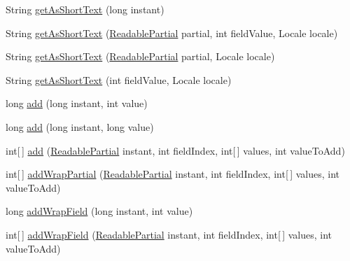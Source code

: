 \begin{DoxyCompactItemize}
\item 
String \hyperlink{classorg_1_1joda_1_1time_1_1field_1_1_unsupported_date_time_field_a0b88afcfc9204f496b03997297dc6c84}{get\-As\-Short\-Text} (long instant)
\item 
String \hyperlink{classorg_1_1joda_1_1time_1_1field_1_1_unsupported_date_time_field_a391c7e9cc51aa1ef611d4c1832d211ae}{get\-As\-Short\-Text} (\hyperlink{interfaceorg_1_1joda_1_1time_1_1_readable_partial}{Readable\-Partial} partial, int field\-Value, Locale locale)
\item 
String \hyperlink{classorg_1_1joda_1_1time_1_1field_1_1_unsupported_date_time_field_a62aaf212bda54158ccdd6e121dacc365}{get\-As\-Short\-Text} (\hyperlink{interfaceorg_1_1joda_1_1time_1_1_readable_partial}{Readable\-Partial} partial, Locale locale)
\item 
String \hyperlink{classorg_1_1joda_1_1time_1_1field_1_1_unsupported_date_time_field_a52cdc1898318945516da9385013a9162}{get\-As\-Short\-Text} (int field\-Value, Locale locale)
\item 
long \hyperlink{classorg_1_1joda_1_1time_1_1field_1_1_unsupported_date_time_field_ae9bece48037e0b2a2b18488367734e8b}{add} (long instant, int value)
\item 
long \hyperlink{classorg_1_1joda_1_1time_1_1field_1_1_unsupported_date_time_field_a54cd7b170f1d0bf9cfaa801cca7f4471}{add} (long instant, long value)
\item 
int\mbox{[}$\,$\mbox{]} \hyperlink{classorg_1_1joda_1_1time_1_1field_1_1_unsupported_date_time_field_a8695ed9b4b6b5c60585c7a52a2e7880f}{add} (\hyperlink{interfaceorg_1_1joda_1_1time_1_1_readable_partial}{Readable\-Partial} instant, int field\-Index, int\mbox{[}$\,$\mbox{]} values, int value\-To\-Add)
\item 
int\mbox{[}$\,$\mbox{]} \hyperlink{classorg_1_1joda_1_1time_1_1field_1_1_unsupported_date_time_field_a9bea6dd919c41b05e948eb1178be1e88}{add\-Wrap\-Partial} (\hyperlink{interfaceorg_1_1joda_1_1time_1_1_readable_partial}{Readable\-Partial} instant, int field\-Index, int\mbox{[}$\,$\mbox{]} values, int value\-To\-Add)
\item 
long \hyperlink{classorg_1_1joda_1_1time_1_1field_1_1_unsupported_date_time_field_ac02537cb58f2f5028e22d6e8acb57762}{add\-Wrap\-Field} (long instant, int value)
\item 
int\mbox{[}$\,$\mbox{]} \hyperlink{classorg_1_1joda_1_1time_1_1field_1_1_unsupported_date_time_field_afde3857226b75d9647b55afd3577f686}{add\-Wrap\-Field} (\hyperlink{interfaceorg_1_1joda_1_1time_1_1_readable_partial}{Readable\-Partial} instant, int field\-Index, int\mbox{[}$\,$\mbox{]} values, int value\-To\-Add)

\end{DoxyCompactItemize}
